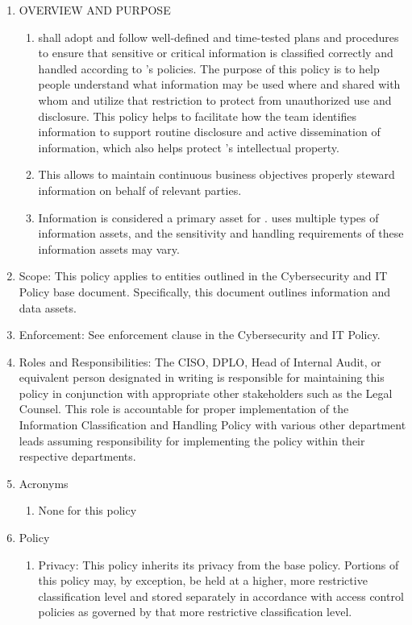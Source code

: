 \documentclass[../main.tex]{subfiles}
\begin{document}
\begin{enumerate}
    \item OVERVIEW AND PURPOSE
    \begin{enumerate}
        \item \CompanyName shall adopt and follow well-defined and time-tested plans and procedures to ensure that sensitive or critical information is classified correctly and handled according to \CompanyName's policies. The purpose of this policy is to help people understand what information may be used where and shared with whom and utilize that restriction to protect from unauthorized use and disclosure. This policy helps to facilitate how the \CompanyName team identifies information to support routine disclosure and active dissemination of information, which also helps protect \CompanyName's intellectual property.
        \item This allows \CompanyName to maintain continuous business objectives properly steward information on behalf of relevant parties.
        \item Information is considered a primary asset for \CompanyName. \CompanyName uses multiple types of information assets, and the sensitivity and handling requirements of these information assets may vary.
    \end{enumerate}
    \item Scope:
    This policy applies to entities outlined in the Cybersecurity and IT Policy base document. Specifically, this document outlines information and data assets.
    \item Enforcement:
    See enforcement clause in the Cybersecurity and IT Policy.
    \item Roles and Responsibilities:
    The CISO, DPLO, Head of Internal Audit, or equivalent person designated in writing is responsible for maintaining this policy in conjunction with appropriate other stakeholders such as the Legal Counsel. This role is accountable for proper implementation of the Information Classification and Handling Policy with various other department leads assuming responsibility for implementing the policy within their respective departments.
    \item Acronyms
    \begin{enumerate}
        \item None for this policy
    \end{enumerate}
    \item Policy
    \begin{enumerate}
        \item Privacy: This policy inherits its privacy from the base policy. Portions of this policy may, by exception, be held at a higher, more restrictive classification level and stored separately in accordance with access control policies as governed by that more restrictive classification level.

\end{enumerate}
\end{enumerate}
\end{document}
